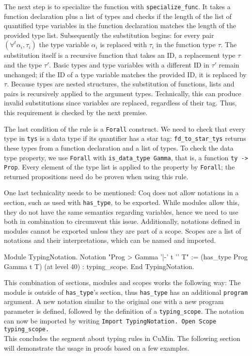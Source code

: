 \documentclass[fleqn]{scrreprt}
\newcommand{\coqinline}[1]{\texttt{#1}}
\begin{document}
 \par
 The next step is to specialize the function with \coqinline{specialize_func}. It takes a function declaration plus a list of types and checks if the length of the list of quantified type variables in the function declaration matches the length of the provided type list. Subsequently the substitution begins: for every pair $(\forall^{t}\alpha_{i}, \tau_{i})$ the type variable $\alpha_{i}$ is replaced with $\tau_{i}$ in the function type $\tau$. The substitution itself is a recursive function that takes an ID, a replacement type $\tau$ and the type $\tau'$. Basic types and type variables with a different ID in $\tau'$ remain unchanged; if the ID of a type variable matches the provided ID, it is replaced by $\tau$. Because types are nested structures, the substitution of functions, lists and pairs is recursively applied to the argument types. Technically, this can produce invalid substitutions since variables are replaced, regardless of their tag. Thus, this requirement is checked by the next premise.
 \par
 The last condition of the rule is a \coqinline{Forall} construct. We need to check that every type in \coqinline{tys} is a data type if its quantifier has a star tag: \coqinline{fd_to_star_tys} returns these types from a function declaration and a list of types. To check the data type property, we use \coqinline{Forall} with \coqinline{is_data_type Gamma}, that is, a function \coqinline{ty -> Prop}. Every element of the type list is applied to the property by \coqinline{Forall}; the returned propositions need do be proven when using this rule.
 \par
 One last technicality needs to be mentioned: Coq does not allow notations in a section, such as used with \coqinline{has_type}, to be exported. While modules allow this, they do not have the same semantics regarding variables, hence we need to use both in combination to circumvent this issue. Additionally, notations defined in modules cannot be exported unless they are part of a scope. Scopes are a list of notations and their interpretations, which can be named and imported.
 \begin{coqcode}
 Module TypingNotation.
   Notation "Prog > Gamma '|-' t '\in' T" := (has_type Prog Gamma t T)
   (at level 40) : typing_scope.
 End TypingNotation.
 \end{coqcode}
 This combination of sections, modules and scopes works the following way: The module is outside of \coqinline{has_type}'s section, thus \coqinline{has_type} has an additional \coqinline{program} argument. A new notation similar to the original one with a new program parameter is defined, followed by the definition of a \coqinline{typing_scope}.
 The notation can now be imported by writing \coqinline{Import TypingNotation. Open Scope typing_scope.}\\
 This concludes the segment about typing rules in CuMin. The following section will demonstrate the usage in proofs based on a few examples.
\end{document}

